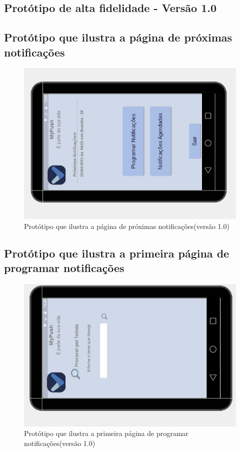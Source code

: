 \begin{apendicesenv}
\chapter{Protótipo de alta fidelidade - Versão 1.0}

  \pagebreak
  \section*{Protótipo que ilustra a página de próximas notificações}

    \begin{figure}[!htbp]
      \centering
      \includegraphics[scale=0.9, angle=-90]{editaveis/figuras/prototipo_alta_fidelidade_v1/1_1}
      \caption{Protótipo que ilustra a página de próximas notificações(versão 1.0)}
      \label{v1}
    \end{figure}
    
    \pagebreak
      \section*{Protótipo que ilustra a primeira página de programar notificações}

    \begin{figure}[!htbp]
      \centering
      \includegraphics[scale=0.9, angle=-90]{editaveis/figuras/prototipo_alta_fidelidade_v1/1_2}
      \caption{Protótipo que ilustra a primeira página de programar notificações(versão 1.0)}
      \label{v1}
    \end{figure}
    

\end{apendicesenv}
